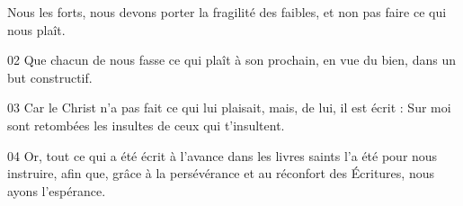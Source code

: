 Nous les forts, nous devons porter la fragilité des faibles, et non pas faire ce qui nous plaît.

02 Que chacun de nous fasse ce qui plaît à son prochain, en vue du bien, dans un but constructif.

03 Car le Christ n’a pas fait ce qui lui plaisait, mais, de lui, il est écrit : Sur moi sont retombées les insultes de ceux qui t’insultent.

04 Or, tout ce qui a été écrit à l'avance dans les livres saints l’a été pour nous instruire, afin que, grâce à la persévérance et au réconfort des Écritures, nous ayons l’espérance.

